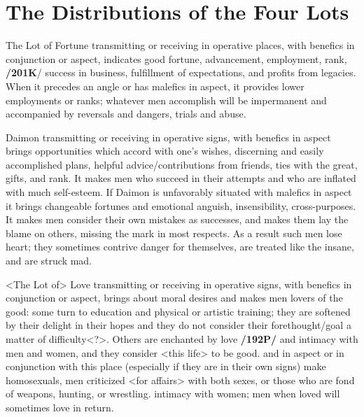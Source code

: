 \section{The Distributions of the Four Lots}

The Lot of Fortune transmitting or receiving in operative places, with benefics in conjunction or aspect, indicates good fortune, advancement, employment, rank, \textbf{/201K}/ success in business, fulfillment of expectations, and profits from legacies. When it precedes an angle or has malefics in aspect, it provides lower employments or ranks; whatever men accomplish will be impermanent and accompanied by reversals and dangers, trials and abuse.

Daimon  transmitting or receiving in operative signs, with benefics in aspect brings opportunities which accord with one’s wishes, discerning and easily accomplished plans, helpful advice/contributions from friends, ties with the great, gifts, and rank. It makes men who succeed in their attempts and who are inflated with much self-esteem. If Daimon is unfavorably situated with malefics in aspect it brings
changeable fortunes and emotional anguish, insensibility, cross-purposes. It makes men consider their own mistakes as successes, and makes them lay the blame on others, missing the mark in most respects. As a result such men lose heart; they sometimes contrive danger for themselves, are treated like the insane, and are struck mad.

<The Lot of> Love  transmitting or receiving in operative signs, with benefics in conjunction or aspect, brings about moral desires and makes men lovers of the good: some turn to education and physical or artistic training; they are softened by their delight in their hopes and they do not consider their forethought/goal a matter of difficulty<?>. Others are enchanted by love \textbf{/192P/} and intimacy with men and women, and they consider <this life> to be good. \Mars\xspace and \Mercury\xspace in aspect or in conjunction with this place (especially if they are in their own signs) make homosexuals, men criticized <for affairs> with both sexes, or those who are fond of weapons, hunting, or wrestling. \Venus\xspace <in aspect or conjunction brings> intimacy with women; men when loved will sometimes love in return.

